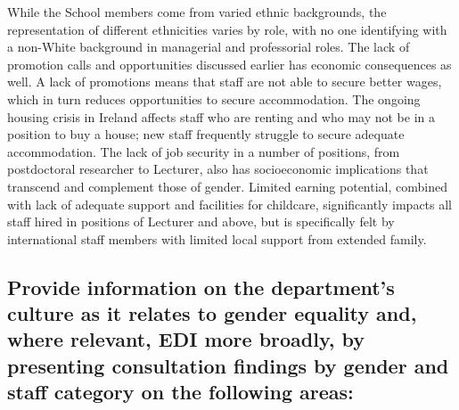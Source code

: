 While the School members come from varied ethnic backgrounds, the representation of different ethnicities varies by role, with no one identifying with a non-White background in managerial and professorial roles. 
The lack of promotion calls and opportunities discussed earlier has economic consequences as well. A lack of promotions means that staff are not able to secure better wages, which in turn reduces opportunities to secure accommodation. The ongoing housing crisis in Ireland affects staff who are renting and who may not be in a position to buy a house; new staff frequently struggle to secure adequate accommodation.
The lack of job security in a number of positions, from postdoctoral researcher to Lecturer, also has socioeconomic implications that transcend and complement those of gender. Limited earning potential, combined with lack of adequate support and facilities for childcare, significantly impacts all staff hired in positions of Lecturer and above, but is specifically felt by international staff members with limited local support from extended family.

\subsection{Provide information on the department’s culture as it relates to gender equality and, where relevant, EDI more broadly, by presenting consultation findings by gender and staff category on the following areas:}

